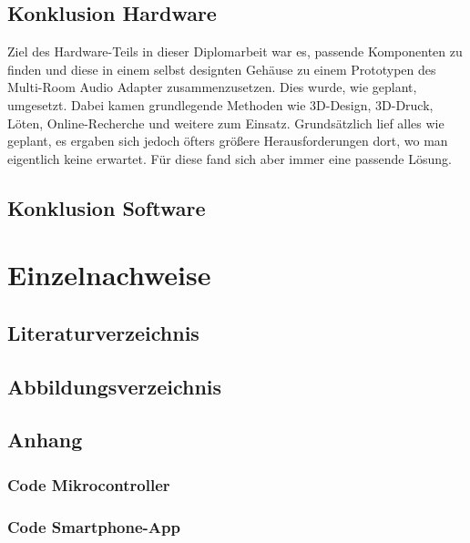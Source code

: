 \documentclass[11pt, twoside]{article}
\begin{document}
\subsection{Konklusion Hardware}
Ziel des Hardware-Teils in dieser Diplomarbeit war es, passende Komponenten zu finden und diese in einem selbst designten Gehäuse zu einem Prototypen des Multi-Room Audio Adapter zusammenzusetzen. Dies wurde, wie geplant, umgesetzt. Dabei kamen grundlegende Methoden wie 3D-Design, 3D-Druck, Löten, Online-Recherche und weitere zum Einsatz. Grundsätzlich lief alles wie geplant, es ergaben sich jedoch öfters größere Herausforderungen dort, wo man eigentlich keine erwartet. Für diese fand sich aber immer eine passende Lösung.
\subsection{Konklusion Software}
\newpage
\section{Einzelnachweise}
\subsection{Literaturverzeichnis}
\printbibliography
\newpage
\subsection{Abbildungsverzeichnis}
\listoffigures
\newpage
\subsection{Anhang}
\subsubsection{Code Mikrocontroller}
\subsubsection{Code Smartphone-App}
\end{document}
